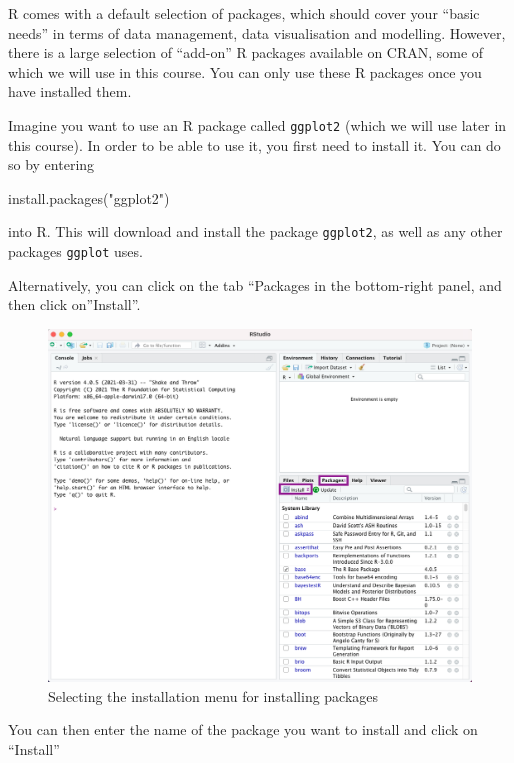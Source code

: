 \documentclass[
]{book}
\newenvironment{Shaded}{\begin{snugshade}}{\end{snugshade}}
\newcommand{\FunctionTok}[1]{\textcolor[rgb]{0.00,0.00,0.00}{#1}}
\newcommand{\NormalTok}[1]{#1}
\newcommand{\StringTok}[1]{\textcolor[rgb]{0.31,0.60,0.02}{#1}}
\begin{document}
R comes with a default selection of packages, which should cover your ``basic needs'' in terms of data management, data visualisation and modelling. However, there is a large selection of ``add-on'' R packages available on CRAN, some of which we will use in this course. You can only use these R packages once you have installed them.

Imagine you want to use an R package called \texttt{ggplot2} (which we will use later in this course). In order to be able to use it, you first need to install it. You can do so by entering

\begin{Shaded}
\begin{Highlighting}[]
\FunctionTok{install.packages}\NormalTok{(}\StringTok{"ggplot2"}\NormalTok{)}
\end{Highlighting}
\end{Shaded}

into R. This will download and install the package \texttt{ggplot2}, as well as any other packages \texttt{ggplot} uses.

Alternatively, you can click on the tab ``Packages in the bottom-right panel, and then click on''Install''.

\begin{figure}

{\centering \includegraphics[width=0.85\linewidth]{Packages_Install} 

}

\caption{Selecting the installation menu for installing packages}\label{fig:install1}
\end{figure}

You can then enter the name of the package you want to install and click on ``Install''
\end{document}
